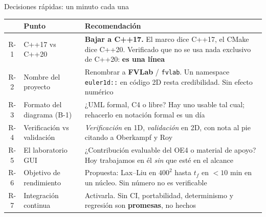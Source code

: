 \documentclass[aspectratio=169,10pt]{beamer}
\newcommand{\cod}[1]{\texttt{\small #1}}
\begin{document}
\begin{frame}[shrink]{Decisiones rápidas: un minuto cada una}
  \centering\scriptsize
  \begin{tabular}{@{}clp{72mm}@{}}
    \toprule
    & \textbf{Punto} & \textbf{Recomendación} \\
    \midrule
    R-1 & C++17 vs C++20 & \textbf{Bajar a C++17.} El marco dice C++17, el CMake dice C++20. Verificado que no se usa nada exclusivo de C++20: \textbf{es una línea} \\
    R-2 & Nombre del proyecto & Renombrar a \textbf{FVLab} / \cod{fvlab}. Un namespace \cod{euler1d::} en código 2D resta credibilidad. Sin efecto numérico \\
    R-3 & Formato del diagrama (B-1) & ¿UML formal, C4 o libre? Hay uno usable tal cual; rehacerlo en notación formal es un día \\
    R-4 & Verificación vs validación & \emph{Verificación} en 1D, \emph{validación} en 2D, con nota al pie citando a Oberkampf y Roy \\
    R-5 & El laboratorio GUI & ¿Contribución evaluable del OE4 o material de apoyo? Hoy trabajamos en él \emph{sin} que esté en el alcance \\
    R-6 & Objetivo de rendimiento & Propuesta: Lax--Liu en $400^2$ hasta $t_f$ en $<10$ min en un núcleo. Sin número no es verificable \\
    R-7 & Integración continua & Activarla. Sin CI, portabilidad, determinismo y regresión son \textbf{promesas}, no hechos \\
    \bottomrule
  \end{tabular}
\end{frame}
\end{document}
